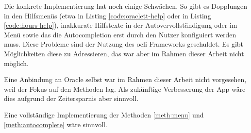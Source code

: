 \documentclass[oneside,bibliography=totocnumbered,BCOR=5mm]{scrbook}
\begin{document}
Die konkrete Implementierung hat noch einige Schwächen. So gibt es Dopplungen in
den Hilfsmenüs (etwa  in Listing \ref{code:oraclett-help}
oder  in Listing \ref{code:hours-help}), inakkurate
Hilfstexte in der Autovervollständigung oder im 
Menü sowie das die Autocompletion erst durch den Nutzer konfiguiert werden
muss. Diese Probleme sind der Nutzung des ocli Frameworks geschuldet. Es gibt
Möglichkeiten diese zu Adressieren, das war aber im Rahmen dieser Arbeit nicht
möglich.

Eine Anbindung an Oracle selbst war im Rahmen dieser Arbeit nicht vorgesehen,
weil der Fokus auf den Methoden lag. Als zukünftige Verbesserung der App wäre
dies aufgrund der Zeitersparnis aber sinnvoll.

Eine vollständige Implementierung der Methoden \ref{meth:menu} und
\ref{meth:autocomplete} wäre sinnvoll.
\end{document}
